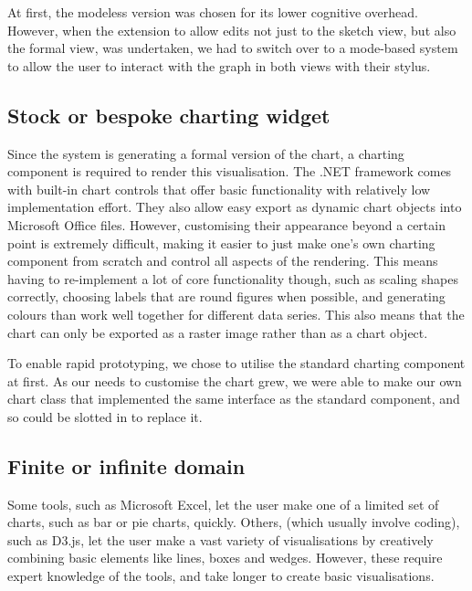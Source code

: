 	At first, the modeless version was chosen for its lower cognitive overhead. However, when the extension to allow edits not just to the sketch view, but also the formal view, was undertaken, we had to switch over to a mode-based system to allow the user to interact with the graph in both views with their stylus.
	
	\subsection{Stock or bespoke charting widget}	
	Since the system is generating a formal version of the chart, a charting component is required to render this visualisation. The .NET framework comes with built-in chart controls that offer basic functionality with relatively low implementation effort. They also allow easy export as dynamic chart objects into Microsoft Office files. However, customising their appearance beyond a certain point is extremely difficult, making it easier to just make one's own charting component from scratch and control all aspects of the rendering. This means having to re-implement a lot of core functionality though, such as scaling shapes correctly, choosing labels that are round figures when possible, and generating colours than work well together for different data series. This also means that the chart can only be exported as a raster image rather than as a chart object.
	
	To enable rapid prototyping, we chose to utilise the standard charting component at first. As our needs to customise the chart grew, we were able to make our own chart class that implemented the same interface as the standard component, and so could be slotted in to replace it.
	
	\subsection{Finite or infinite domain}
	Some tools, such as Microsoft Excel, let the user make one of a limited set of charts, such as bar or pie charts, quickly. Others, (which usually involve coding), such as D3.js, let the user make a vast variety of visualisations by creatively combining basic elements like lines, boxes and wedges. However, these require expert knowledge of the tools, and take longer to create basic visualisations. 
	
